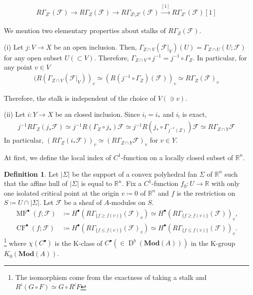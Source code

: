 \documentclass[a4paper,dvipdfmx,reqno,12pt]{amsart}
\theoremstyle{definition}
\newtheorem{Def}[Thm]{Definition}
\newcommand{\deq}{\coloneqq}
\newcommand{\R}{\mathbb{R}}%
\newcommand{\mcal}[1]{\mathcal{#1}}%
\newcommand{\opn}[1]{\operatorname{#1}}
\newcommand{\catn}[1]{\mathbf{#1}}
\newcommand{\xto}[1]{\xrightarrow{#1}}
\numberwithin{equation}{section}
\begin{document}
\cite[(2.6.32)]{MR1299726}

\begin{align}
  R\Gamma_{Z'}(\mcal{F})\to R\Gamma_{Z}(\mcal{F})\to R\Gamma_{Z\setminus Z'}(\mcal{F})\xto{[1]} R\Gamma_{Z'}(\mcal{F})[1]
\end{align}

We mention two elementary properties about stalks of $R\Gamma_{Z}(\mcal{F})$.

(i) Let $j:V\to X$ be an open inclusion.
Then, $\Gamma_{Z\cap V}(\mcal{F}|_V)(U)=\Gamma_{Z\cap U}(U;\mcal{F})$
for any open subset $U (\subset V)$.
Therefore, $\Gamma_{Z\cap V}\circ j^{-1}=j^{-1}\circ \Gamma_{Z}$.
In particular, for any point $v\in V$
\begin{align}
  (R(\Gamma_{Z\cap V}(\mcal{F}|_{V}))_v\simeq (R(j^{-1}\circ \Gamma_{Z})(\mcal{F}))_v\simeq R\Gamma_{Z}(\mcal{F})_v
\end{align}

Therefore, the stalk is independent of the choice of $V (\ni v)$.

(ii) Let $i: Y\to X$ be an closed inclusion.
Since $i_!=i_*$ and $i_!$ is exact,
\begin{align}
  j^{-1}R\Gamma_{Z}(j_*\mcal{F})\simeq j^{-1}R(\Gamma_{Z}\circ j_*)\mcal{F}
  \simeq j^{-1}R(j_*\circ \Gamma_{j^{-1}(Z)})\mcal{F}
  \simeq R\Gamma_{Z\cap Y}\mcal{F}
\end{align}
In particular, $(R\Gamma_{Z}(i_*\mcal{F}))_v
  \simeq (R\Gamma_{Z\cap Y}\mcal{F})_v$ for $v\in Y$.

At first, we define the local index of $C^{1}$-function on a locally
closed subset of $\R^{n}$.

\begin{Def}
  Let $|\Sigma|$ be the support of a convex polyhedral fan $\Sigma$ of $\R^{n}$
  such that the affine hull of $|\Sigma|$ is equal to $\R^{n}$.
  Fix a $C^{1}$-function $f_0:U\to \R$ with only
  one isolated critical point at the origin $v\deq 0$ of $\R^{n}$
  and $f$ is the restriction on $S\deq U \cap |\Sigma|$.
  Let $\mcal{F}$ be a sheaf of $A$-modules on $S$.
  \begin{align}
    \opn{MF}^{\bullet}(f;\mcal{F})
     & \deq H^{\bullet}(R\Gamma_{\{f\geq f(v)\}}(\mcal{F})_v) \simeq
    H^{\bullet}(R\Gamma_{\{f\geq f(v)\}}(\mcal{F}))_v,               \\
    \opn{CF}^{\bullet}(f;\mcal{F})
     & \deq H^{\bullet}(R\Gamma_{\{f\leq f(v)\}}(\mcal{F})_v) \simeq
    H^{\bullet}(R\Gamma_{\{f\leq f(v)\}}(\mcal{F}))_v.
  \end{align}
  \footnote{The isomorphism come from the exactness of taking
    a stalk and $R^{i}(G\circ F)\simeq G\circ R^{i}F$}
  where $\chi(C^{\bullet})$ is the K-class of
  $C^{\bullet}(\in \opn{D}^{b}(\catn{Mod}(A)))$
  in the K-group $K_0(\catn{Mod}(A))$.
\end{Def}
\end{document}
